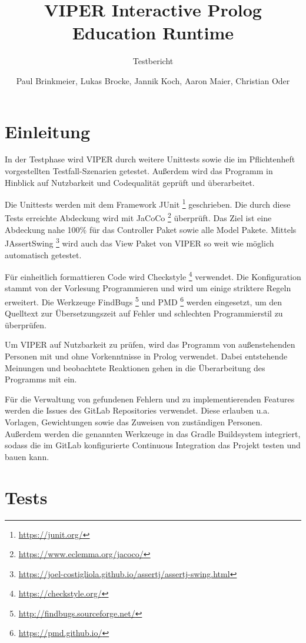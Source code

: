 \documentclass[parskip=full,11pt,twoside]{scrartcl}
\title{VIPER Interactive Prolog Education Runtime}
\subtitle{Testbericht}
\author{Paul Brinkmeier, Lukas Brocke, Jannik Koch, Aaron Maier, Christian Oder}
\date{}
\begin{document}
\maketitle

\tableofcontents

\section{Einleitung}
\setcounter{page}{1}

In der Testphase wird VIPER durch weitere Unittests sowie die im Pflichtenheft vorgestellten Testfall-Szenarien getestet. Außerdem wird das Programm in Hinblick auf Nutzbarkeit und Codequalität geprüft und überarbeitet.

Die Unittests werden mit dem Framework JUnit \footnote{\url{https://junit.org/}} geschrieben. Die durch diese Tests erreichte Abdeckung wird mit JaCoCo \footnote{\url{https://www.eclemma.org/jacoco/}} überprüft. Das Ziel ist eine Abdeckung nahe 100\% für das Controller Paket sowie alle Model Pakete. Mittels JAssertSwing \footnote{\url{https://joel-costigliola.github.io/assertj/assertj-swing.html}} wird auch das View Paket von VIPER so weit wie möglich automatisch getestet.

Für einheitlich formattieren Code wird Checkstyle \footnote{\url{https://checkstyle.org/}} verwendet. Die Konfiguration stammt von der Vorlesung Programmieren und wird um einige striktere Regeln erweitert. Die Werkzeuge FindBugs \footnote{\url{http://findbugs.sourceforge.net/}} und PMD \footnote{\url{https://pmd.github.io/}} werden eingesetzt, um den Quelltext zur Übersetzungszeit auf Fehler und schlechten Programmierstil zu überprüfen.

Um VIPER auf Nutzbarkeit zu prüfen, wird das Programm von außenstehenden Personen mit und ohne Vorkenntnisse in Prolog verwendet. Dabei entstehende Meinungen und beobachtete Reaktionen gehen in die Überarbeitung des Programms mit ein.

Für die Verwaltung von gefundenen Fehlern und zu implementierenden Features werden die Issues des GitLab Repositories verwendet. Diese erlauben u.a. Vorlagen, Gewichtungen sowie das Zuweisen von zuständigen Personen. Außerdem werden die genannten Werkzeuge in das Gradle Buildsystem integriert, sodass die im GitLab konfigurierte Continuous Integration das Projekt testen und bauen kann.

\section{Tests}
\end{document}
